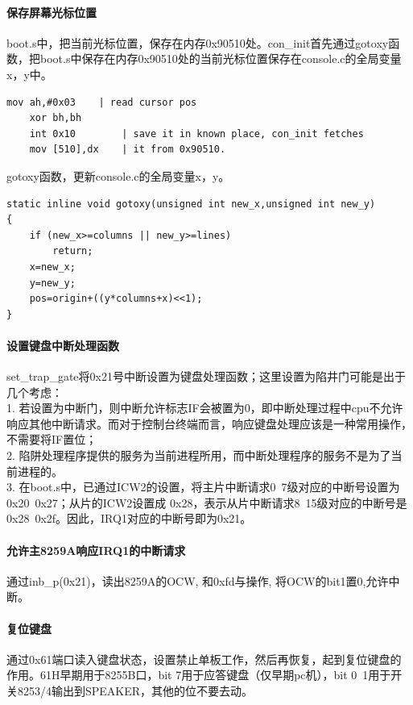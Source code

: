\documentclass[12pt]{article}
\begin{document}
\paragraph{保存屏幕光标位置}
boot.s中，把当前光标位置，保存在内存0x90510处。con\_init首先通过gotoxy函数，把boot.s中保存在内存0x90510处的当前光标位置保存在console.c的全局变量x，y中。
\begin{lstlisting}[breaklines]
	mov	ah,#0x03	| read cursor pos
	xor	bh,bh
	int	0x10		| save it in known place, con_init fetches
	mov	[510],dx	| it from 0x90510.
\end{lstlisting}
gotoxy函数，更新console.c的全局变量x，y。
\begin{lstlisting}[breaklines]
static inline void gotoxy(unsigned int new_x,unsigned int new_y)
{
	if (new_x>=columns || new_y>=lines)
		return;
	x=new_x;
	y=new_y;
	pos=origin+((y*columns+x)<<1);
}
\end{lstlisting}
\paragraph{设置键盘中断处理函数} set\_trap\_gate将0x21号中断设置为键盘处理函数；这里设置为陷井门可能是出于几个考虑：\\
1. 若设置为中断门，则中断允许标志IF会被置为0，即中断处理过程中cpu不允许响应其他中断请求。而对于控制台终端而言，响应键盘处理应该是一种常用操作，不需要将IF置位；\\
2. 陷阱处理程序提供的服务为当前进程所用，而中断处理程序的服务不是为了当前进程的。\\
3. 在boot.s中，已通过ICW2的设置，将主片中断请求0~7级对应的中断号设置为0x20~0x27；从片的ICW2设置成 0x28，表示从片中断请求8~15级对应的中断号是 0x28~0x2f。因此，IRQ1对应的中断号即为0x21。
\paragraph{允许主8259A响应IRQ1的中断请求} 
通过inb\_p(0x21)，读出8259A的OCW, 和0xfd与操作, 将OCW的bit1置0,允许中断。
\paragraph{复位键盘} 通过0x61端口读入键盘状态，设置禁止单板工作，然后再恢复，起到复位键盘的作用。61H早期用于8255B口，bit 7用于应答键盘（仅早期pc机），bit 0~1用于开关8253/4输出到SPEAKER，其他的位不要去动。
\end{document}
